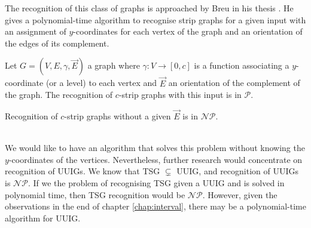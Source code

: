 The recognition of this class of graphs is approached by Breu in his thesis \cite{breuAlgorithmicAspectsConstrained1996}. He gives a polynomial-time algorithm to recognise strip graphs for a given input with an assignment of $y$-coordinates for each vertex of the graph and an orientation of the edges of its complement.

\begin{theorem}
  Let $G = (V,E,\gamma,\overrightarrow{E})$ a graph where $\gamma: V \to [0,c]$ is a function associating a $y$-coordinate (or a level) to each vertex and $\overrightarrow{E}$ an orientation of the complement of the graph. The recognition of $c$-strip graphs with this input is in $\mathcal{P}$.
\end{theorem}

\begin{obs}
  Recognition of $c$-strip graphs without a given $\overrightarrow{E}$ is in $\mathcal{NP}$.
\end{obs}

\\

We would like to have an algorithm that solves this problem without knowing the $y$-coordinates of the vertices. Nevertheless, further research would concentrate on recognition of UUIGs. We know that TSG $\subsetneq$ UUIG, and recognition of UUIGs is $\mathcal{NP}$. If we the problem of recognising TSG given a UUIG and is solved in polynomial time, then TSG recognition would be $\mathcal{NP}$. However, given the observations in the end of chapter \ref{chap:interval}, there may be a polynomial-time algorithm for UUIG.

